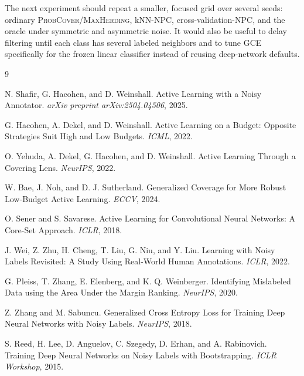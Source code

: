 \documentclass[10pt,twocolumn]{article}
\newcommand{\pc}{\textnormal{\textsc{ProbCover}}}
\newcommand{\mh}{\textnormal{\textsc{MaxHerding}}}
\newcommand{\gce}{\textnormal{\textsc{GCE}}}
\begin{document}
The next experiment should repeat a smaller, focused grid over several seeds:
ordinary \pc{}/\mh{}, kNN-NPC, cross-validation-NPC, and the oracle under
symmetric and asymmetric noise. It would also be useful to delay filtering
until each class has several labeled neighbors and to tune \gce{} specifically
for the frozen linear classifier instead of reusing deep-network defaults.

\begin{thebibliography}{9}\small

N. Shafir, G. Hacohen, and D. Weinshall.
\newblock Active Learning with a Noisy Annotator.
\newblock \emph{arXiv preprint arXiv:2504.04506}, 2025.

G. Hacohen, A. Dekel, and D. Weinshall.
\newblock Active Learning on a Budget: Opposite Strategies Suit High and Low Budgets.
\newblock \emph{ICML}, 2022.

O. Yehuda, A. Dekel, G. Hacohen, and D. Weinshall.
\newblock Active Learning Through a Covering Lens.
\newblock \emph{NeurIPS}, 2022.

W. Bae, J. Noh, and D. J. Sutherland.
\newblock Generalized Coverage for More Robust Low-Budget Active Learning.
\newblock \emph{ECCV}, 2024.

O. Sener and S. Savarese.
\newblock Active Learning for Convolutional Neural Networks: A Core-Set Approach.
\newblock \emph{ICLR}, 2018.

J. Wei, Z. Zhu, H. Cheng, T. Liu, G. Niu, and Y. Liu.
\newblock Learning with Noisy Labels Revisited: A Study Using Real-World Human Annotations.
\newblock \emph{ICLR}, 2022.

G. Pleiss, T. Zhang, E. Elenberg, and K. Q. Weinberger.
\newblock Identifying Mislabeled Data using the Area Under the Margin Ranking.
\newblock \emph{NeurIPS}, 2020.

Z. Zhang and M. Sabuncu.
\newblock Generalized Cross Entropy Loss for Training Deep Neural Networks with Noisy Labels.
\newblock \emph{NeurIPS}, 2018.

S. Reed, H. Lee, D. Anguelov, C. Szegedy, D. Erhan, and A. Rabinovich.
\newblock Training Deep Neural Networks on Noisy Labels with Bootstrapping.
\newblock \emph{ICLR Workshop}, 2015.

\end{thebibliography}
\end{document}
